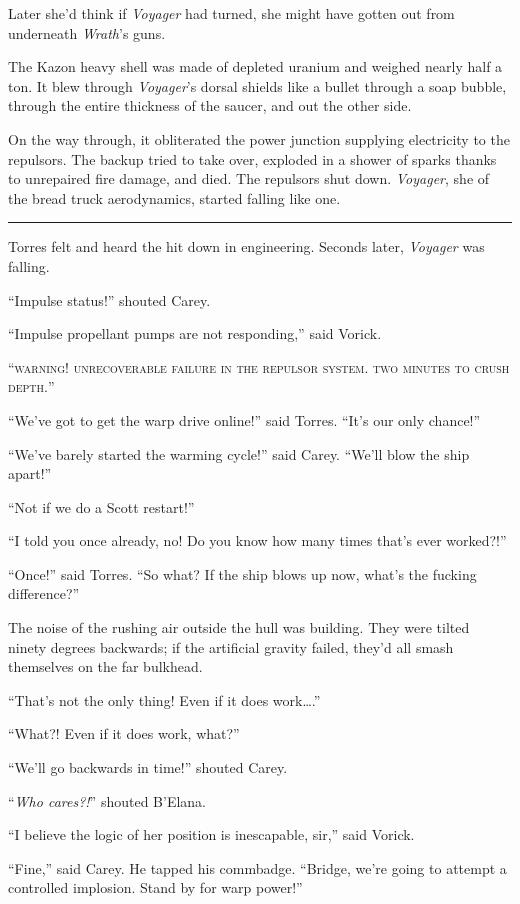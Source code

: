 \documentclass[twoside,letterpaper,12pt]{memoir}
\begin{document}
Later she'd think if \textit{Voyager} had turned, she might have gotten out from underneath \textit{Wrath}'s guns.

The Kazon heavy shell was made of depleted uranium and weighed nearly half a ton. It blew through \textit{Voyager}'s dorsal shields like a bullet through a soap bubble, through the entire thickness of the saucer, and out the other side.

On the way through, it obliterated the power junction supplying electricity to the repulsors. The backup tried to take over, exploded in a shower of sparks thanks to unrepaired fire damage, and died. The repulsors shut down. \textit{Voyager}, she of the bread truck aerodynamics, started falling like one.

\fancybreak{\rule{3cm}{0.4 pt}}
Torres felt and heard the hit down in engineering. Seconds later, \textit{Voyager} was falling.

``Impulse status!'' shouted Carey.

``Impulse propellant pumps are not responding,'' said Vorick.

``\textsc{warning! unrecoverable failure in the repulsor system. two minutes to crush depth.}''

``We've got to get the warp drive online!'' said Torres. ``It's our only chance!''

``We've barely started the warming cycle!'' said Carey. ``We'll blow the ship apart!''

``Not if we do a Scott restart!''

``I told you once already, no! Do you know how many times that's ever worked?!''

``Once!'' said Torres. ``So what? If the ship blows up now, what's the fucking difference?''

The noise of the rushing air outside the hull was building. They were tilted ninety degrees backwards; if the artificial gravity failed, they'd all smash themselves on the far bulkhead.

``That's not the only thing! Even if it does work\ldots .''

``What?! Even if it does work, what?''

``We'll go backwards in time!'' shouted Carey.

``\textit{Who cares?!}'' shouted B'Elana.

``I believe the logic of her position is inescapable, sir,'' said Vorick.

``Fine,'' said Carey. He tapped his commbadge. ``Bridge, we're going to attempt a controlled implosion. Stand by for warp power!''
\end{document}

